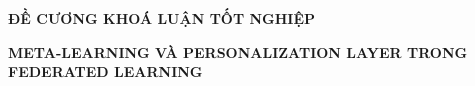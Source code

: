 \documentclass{article}[14pt]
\begin{document}
    \begin{figure}[h]
        \begin{floatrow}


        \end{floatrow}
    \end{figure}

    \begin{center}
        \textbf{\Large ĐỀ CƯƠNG KHOÁ LUẬN TỐT NGHIỆP} \\ 
    \end{center}

    \begin{center}
        \textbf{\huge META-LEARNING VÀ PERSONALIZATION LAYER TRONG FEDERATED LEARNING} 
    \end{center}
    {%

    }

    \vspace{.5cm}

    \Large
\end{document}
